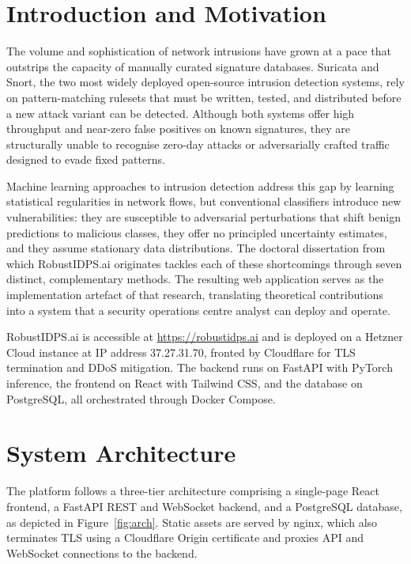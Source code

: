 \documentclass[11pt,a4paper]{article}
\begin{document}
\section{Introduction and Motivation}

The volume and sophistication of network intrusions have grown at a pace
that outstrips the capacity of manually curated signature databases.
Suricata and Snort, the two most widely deployed open-source intrusion
detection systems, rely on pattern-matching rulesets that must be written,
tested, and distributed before a new attack variant can be detected.
Although both systems offer high throughput and near-zero false positives
on known signatures, they are structurally unable to recognise zero-day
attacks or adversarially crafted traffic designed to evade fixed patterns.

Machine learning approaches to intrusion detection address this gap by
learning statistical regularities in network flows, but conventional
classifiers introduce new vulnerabilities: they are susceptible to
adversarial perturbations that shift benign predictions to malicious
classes, they offer no principled uncertainty estimates, and they assume
stationary data distributions. The doctoral dissertation from which
RobustIDPS.ai originates tackles each of these shortcomings through seven
distinct, complementary methods. The resulting web application serves as
the implementation artefact of that research, translating theoretical
contributions into a system that a security operations centre analyst can
deploy and operate.

RobustIDPS.ai is accessible at \url{https://robustidps.ai} and is
deployed on a Hetzner Cloud instance at IP address 37.27.31.70, fronted
by Cloudflare for TLS termination and DDoS mitigation. The backend runs
on FastAPI with PyTorch inference, the frontend on React with Tailwind CSS,
and the database on PostgreSQL, all orchestrated through Docker Compose.

\section{System Architecture}

The platform follows a three-tier architecture comprising a single-page
React frontend, a FastAPI REST and WebSocket backend, and a PostgreSQL
database, as depicted in Figure~\ref{fig:arch}. Static assets are served
by nginx, which also terminates TLS using a Cloudflare Origin certificate
and proxies API and WebSocket connections to the backend.
\end{document}
